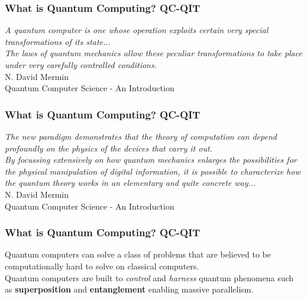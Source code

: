 \documentclass[12pt]{beamer}
\newcommand{\FrameTitle}[2]{\frametitle{#1 \hfill \small\textnormal{\textcolor{midgray}{#2}}}}
\newcommand{\nl}{\vspace*{1em}\\}
\newcommand{\vspthreept}{\vspace*{3pt}}
\begin{document}
\title{}
\author{}
\date{}
\maketitle

\begin{frame}\FrameTitle{What is Quantum Computing?}{QC-QIT}
    \textit{A quantum computer is one whose operation exploits certain very
    special transformations of its state...}\nl

    \textit{The laws of quantum mechanics allow these peculiar transformations
    to take place under very carefully controlled conditions.}\nl

    \vspace*{2em}
    {\hfill\color{VeyLightBlue}N. David Mermin}\\\vspthreept
    {\hfill\color{VeyLightBlue}Quantum Computer Science - An Introduction}\\
\end{frame}

\begin{frame}\FrameTitle{What is Quantum Computing?}{QC-QIT}
    \textit{The new paradigm demonstrates that the theory of computation
    can depend profoundly on the physics of the devices that carry it out.}\nl

    \textit{By focussing extensively on how quantum mechanics enlarges the possibilities
    for the physical manipulation of digital information, it is possible to characterize
    how the quantum theory works in an elementary and quite concrete way...}\nl

    \vspace*{2em}
    {\hfill\color{VeyLightBlue}N. David Mermin}\\\vspthreept
    {\hfill\color{VeyLightBlue}Quantum Computer Science - An Introduction}\\
\end{frame}

\begin{frame}\FrameTitle{What is Quantum Computing?}{QC-QIT}
    Quantum computers can solve a class of problems that are believed to be computationally hard
    to solve on classical computers.\nl

    Quantum computers are built to \textit{control} and \textit{harness} quantum phenomena such as
    {\color{VeyLightBlue}\textbf{superposition}} and {\color{VeyLightBlue}\textbf{entanglement}}
    enabling massive parallelism.\nl
\end{frame}
\end{document}
